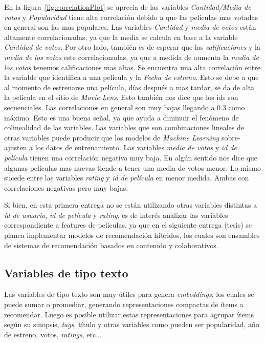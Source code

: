 \documentclass[11pt,a4paper,twoside]{thesis}
\begin{document}
En la figura~\ref{fig:correlationPlot} se aprecia de las variables
\textit{Cantidad/Media de votos} y \textit{Popularidad} tiene alta correlación
debido a que las películas mas votadas en general son las mas populares. Las
variables \textit{Cantidad} y \textit{media de votos} están altamente
correlacionadas, ya que la media se calcula en base a la variable
\textit{Cantidad de votos}. Por otro lado, también es de esperar que las
\textit{calificaciones} y la \textit{media de los votos} este correlacionadas,
ya que a medida de aumenta la \textit{media de los votos} tenemos
calificaciones mas altas. Se encuentra una alta correlación entre la variable
que identifica a una película y la \textit{Fecha de estreno}. Esto se debe a
que al momento de estrenarse una película, días después a mas tardar, se da de
alta la película en el sitio de \textit{Movie Lens}. Esto también nos dice que
los ids son secuenciales. Las correlaciones en general son muy bajas llegando a
0.3 como máximo. Esto es una buena señal, ya que ayuda a diminuir el fenómeno
de colinealidad de las variables. Las variables que son combinaciones lineales
de otras variables puede producir que los modelos de \textit{Machine Learning}
sobre-ajusten a los datos de entrenamiento. Las variables \textit{media de
	votos} y \textit{id de película} tienen una correlación negativa muy baja. En
algún sentido nos dice que algunas películas mas nuevas tiende a tener una
media de votos menor. Lo mismo sucede entre las variables \textit{rating} y
\textit{id de película} en menor medida. Ambas con correlaciones negativas pero
muy bajas.

Si bien, en esta primera entrega no se están utilizando otras variables
distintas a \textit{id de usuario}, \textit{id de película} y \textit{rating},
es de interés analizar las variables correspondiente a features de películas,
ya que en el siguiente entrega (tesis) se planea implementar modelos de
recomendación híbridos, los cuales son ensambles de sistemas de recomendación
basados en contenido y colaborativos.

\subsection{Variables de tipo texto}

Las variables de tipo texto son muy útiles para genera \textit{embeddings}, los
cuales se puede sumar o promediar, generando representaciones compactas de
ítems a recomendar. Luego es posible utilizar estas representaciones para
agrupar ítems según su sinopsis, \textit{tags}, título y otras variables como
pueden ser popularidad, año de estreno, votos, \textit{ratings}, etc...
\end{document}
